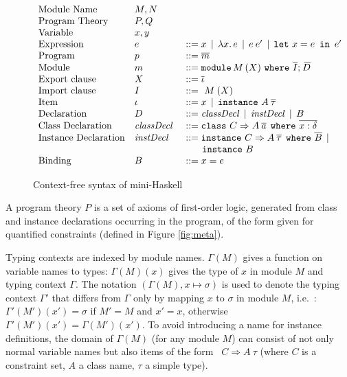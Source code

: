 \begin{figure} 
\[ \begin{array}[c]{lll}
{\rm Module\ Name}          &    M,N            & \\
{\rm Program\ Theory}       &    P,Q            &\\
{\rm Variable}              &    x, y           &\\
{\rm Expression}            &    e              & ::= x \,\mid\, \lambda x.\,e  \,\mid\, e\:e' \,\mid\, \mlet x = e\,\iin\,e'\\ 
{\rm Program}               &    p              & ::= \overline{m}\\
{\rm Module}                &    m              & ::= \module\, M\, (\exportC) \ \where\ \overline{\importC};\: \overline{\!D}\\
{\rm Export\ clause}        &    \exportC\      & ::= \overline{\iitem}\\
{\rm Import\ clause}        &    \importC\      & ::= \ M\: (X)\\
{\rm Item}                  &    \iitem         & ::= x \,\mid\, \instance\ A\: \overline{\tau} \\ 
{\rm Declaration}           &    D              & ::= \classDecl \,\mid\, \instDecl \,\mid\, B\\
{\rm Class\ Declaration}    &    \classDecl\    & ::= \class\ C \Rightarrow A\: \overline{a}\:\: \where\ \overline{x:\delta}\\
{\rm Instance\ Declaration} &    \instDecl\     & ::= \instance\ C \Rightarrow A\: \overline{\tau}\:\: \where\ \overline{B}  \,\mid\, \\
                            &                   & \hspace*{.6cm} \instance\ B\\
{\rm Binding}               &    B              & ::= x = e 
\end{array} \] 
\caption{Context-free syntax of mini-Haskell}
\label{fig:mini-Haskell-context-free-syntax}
\end{figure}

A program theory $P$ is a set of axioms of first-order logic,
generated from class and instance declarations occurring in the
program, of the form given for quantified constraints (defined in
Figure \ref{fig:meta}).

Typing contexts are indexed by module names. $\Gamma(M)$ gives a
function on variable names to types: $\Gamma(M)(x)$ gives the type of
$x$ in module $M$ and typing context $\Gamma$.  The notation
$(\Gamma(M),x \mapsto \sigma)$ is used to denote the typing context
$\Gamma'$ that differs from $\Gamma$ only by mapping $x$ to $\sigma$
in module $M$, i.e.~: $\Gamma'(M')(x') = \sigma$ if $M' = M$ and
$x'=x$, otherwise $\Gamma'(M')(x') = \Gamma(M')(x')$. To avoid
introducing a name for instance definitions, the domain of $\Gamma(M)$
(for any module $M$) can consist of not only normal variable names but
also items of the form {\tt \instance\ $C \Rightarrow A\:\tau$} (where
$C$ is a constraint set, $A$ a class name, $\tau$ a simple type).

